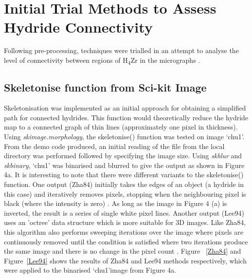 \documentclass{article}
\begin{document}
	\section{Initial Trial Methods to Assess Hydride Connectivity}
	Following pre-processing, techniques were trialled in an attempt to analyse the level of connectivity between regions of H\textsubscript{4}Zr in the micrographs \cite{Simon2021}\cite{Sharma2018}\cite{Sunil2020}.

	\subsection{Skeletonise function from Sci-kit Image}
	Skeletonisation was implemented as an initial approach for obtaining a simplified path for connected hydrides. This function would theoretically reduce the hydride map to a connected graph of thin lines (approximately one pixel in thickness). Using \textit{skimage.morphology}, the skeletonise() function was tested on image ‘chu1’. From the demo code produced, an initial reading of the file from the local directory was performed followed by specifying the image size. Using \textit{skblur} and \textit {skbinary}, ‘chu1’ was binarised and blurred to give the output as shown in Figure 4a. It is interesting to note that there were different variants to the skeletonise() function. One output (Zha84) initially takes the edges of an object (a hydride in this case) and iteratively removes pixels, stopping when the neighbouring pixel is black (where the intensity is zero) \cite{ScikitimageA}. As long as the image in Figure 4 (a) is inverted, the result is a series of single white pixel lines. Another output (Lee94) uses an 'octree' data structure which is more suitable for 3D images. Like Zha84, this algorithm also performs sweeping iterations over the image where pixels are continuously removed until the condition is satisfied where two iterations produce the same image and there is no change in the pixel count \cite{ScikitimageA}. Figure ~\ref{Zha84}  and Figure~\ref{Lee94} shows the results of Zha84 and Lee94 methods respectively, which were applied to the binarised ‘chu1’image from Figure 4a.
\end{document}
